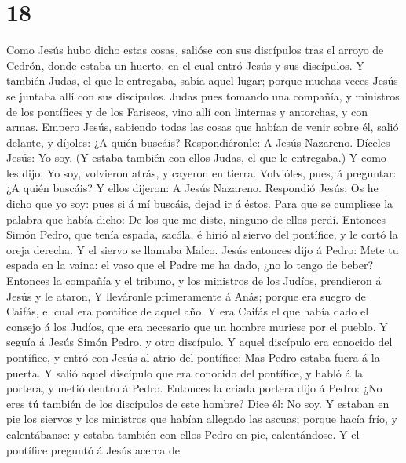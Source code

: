 \hypertarget{section-17}{%
\section{18}\label{section-17}}

 Como Jesús hubo dicho estas cosas, salióse con sus
discípulos tras el arroyo de Cedrón, donde estaba un huerto, en el cual
entró Jesús y sus discípulos.  Y también Judas, el que le
entregaba, sabía aquel lugar; porque muchas veces Jesús se juntaba allí
con sus discípulos.  Judas pues tomando una compañía, y
ministros de los pontífices y de los Fariseos, vino allí con linternas y
antorchas, y con armas.  Empero Jesús, sabiendo todas las
cosas que habían de venir sobre él, salió delante, y díjoles: ¿A quién
buscáis?  Respondiéronle: A Jesús Nazareno. Díceles Jesús:
Yo soy. (Y estaba también con ellos Judas, el que le entregaba.)
 Y como les dijo, Yo soy, volvieron atrás, y cayeron en
tierra.  Volvióles, pues, á preguntar: ¿A quién buscáis? Y
ellos dijeron: A Jesús Nazareno.  Respondió Jesús: Os he
dicho que yo soy: pues si á mí buscáis, dejad ir á éstos. 
Para que se cumpliese la palabra que había dicho: De los que me diste,
ninguno de ellos perdí.  Entonces Simón Pedro, que tenía
espada, sacóla, é hirió al siervo del pontífice, y le cortó la oreja
derecha. Y el siervo se llamaba Malco.  Jesús entonces
dijo á Pedro: Mete tu espada en la vaina: el vaso que el Padre me ha
dado, ¿no lo tengo de beber?  Entonces la compañía y el
tribuno, y los ministros de los Judíos, prendieron á Jesús y le ataron,
 Y lleváronle primeramente á Anás; porque era suegro de
Caifás, el cual era pontífice de aquel año.  Y era Caifás
el que había dado el consejo á los Judíos, que era necesario que un
hombre muriese por el pueblo.  Y seguía á Jesús Simón
Pedro, y otro discípulo. Y aquel discípulo era conocido del pontífice, y
entró con Jesús al atrio del pontífice;  Mas Pedro estaba
fuera á la puerta. Y salió aquel discípulo que era conocido del
pontífice, y habló á la portera, y metió dentro á Pedro. 
Entonces la criada portera dijo á Pedro: ¿No eres tú también de los
discípulos de este hombre? Dice él: No soy.  Y estaban en
pie los siervos y los ministros que habían allegado las ascuas; porque
hacía frío, y calentábanse: y estaba también con ellos Pedro en pie,
calentándose.  Y el pontífice preguntó á Jesús acerca de
